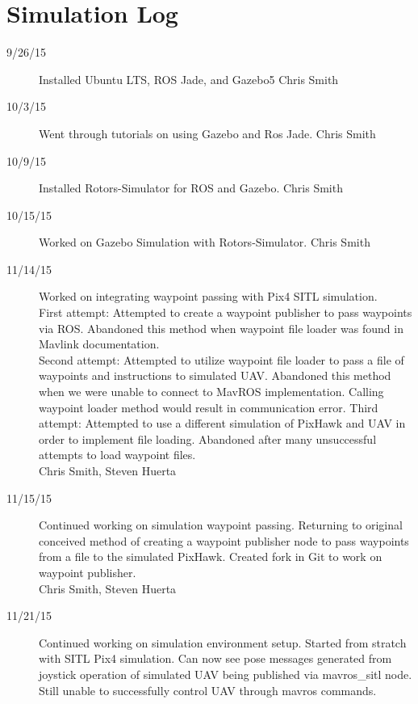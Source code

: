 \section{Simulation Log}

\begin{description}
\item [9/26/15]  Installed Ubuntu LTS, ROS Jade, and Gazebo5 \hfill{Chris Smith}
\item [10/3/15] Went through tutorials on using Gazebo and Ros Jade. \hfill{Chris Smith}
\item [10/9/15] Installed Rotors-Simulator for ROS and Gazebo. \hfill{Chris Smith}
\item [10/15/15] Worked on Gazebo Simulation with Rotors-Simulator. \hfill{Chris Smith}
\item [11/14/15] Worked on integrating waypoint passing with Pix4 SITL simulation.\\
First attempt: Attempted to create a waypoint publisher to pass waypoints via ROS. Abandoned this method when waypoint file loader was found in Mavlink documentation.\\
Second attempt: Attempted to utilize waypoint file loader to pass a file of waypoints and instructions to simulated UAV. Abandoned this method when we were unable to connect to MavROS implementation. Calling waypoint loader method would result in communication error.
Third attempt: Attempted to use a different simulation of PixHawk and UAV in order to implement file loading. Abandoned after many unsuccessful attempts to load waypoint files.\\

\hfill{Chris Smith, Steven Huerta}

\item [11/15/15] Continued working on simulation waypoint passing. Returning to original conceived method of creating a waypoint publisher node to pass waypoints from a file to the simulated PixHawk. Created fork in Git to work on waypoint publisher.\\

\hfill{Chris Smith, Steven Huerta}


\item [11/21/15] Continued working on simulation environment setup. Started from stratch with SITL Pix4 simulation.  Can now see pose messages generated from joystick operation of simulated UAV being published via mavros\_sitl node. Still unable to successfully control UAV through mavros commands.\\


\end{description}
